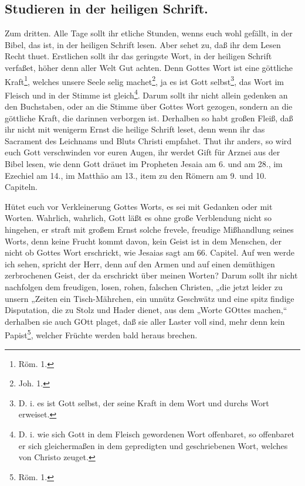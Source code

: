 \subsection*{Studieren in der heiligen Schrift.}

Zum dritten. Alle Tage sollt ihr etliche Stunden, wenns euch wohl gefällt, in der Bibel, das ist, in der heiligen Schrift
lesen. Aber sehet zu, daß ihr dem Lesen Recht thuet. Erstlichen sollt ihr das geringste Wort, in der heiligen Schrift verfaßet, höher denn aller Welt Gut achten. Denn Gottes Wort ist eine göttliche Kraft\footnote{Röm. 1.}, welches unsere Seele selig machet\footnote{Joh. 1.}, ja es ist Gott selbst\footnote{D. i. es ist Gott selbst, der seine Kraft in dem Wort und durchs Wort erweiset.}, das Wort im Fleisch und in der Stimme ist gleich\footnote{D. i. wie sich Gott in dem Fleisch gewordenen Wort offenbaret, so offenbaret er sich gleichermaßen in dem gepredigten und geschriebenen Wort, welches von Christo zeuget.}. Darum sollt ihr nicht allein gedenken an den Buchstaben, oder an die Stimme über Gottes Wort gezogen, sondern an die göttliche Kraft, die darinnen verborgen ist. Derhalben so habt großen Fleiß, daß ihr nicht mit wenigerm Ernst die heilige Schrift leset, denn wenn ihr das Sacrament des Leichnams und Bluts Christi empfahet. Thut ihr anders, so wird euch Gott verschwinden vor euren Augen, ihr werdet Gift für Arznei aus der Bibel lesen, wie denn Gott dräuet im Propheten Jesaia am 6. und am 28., im Ezechiel am 14., im Matthäo am 13., item zu den Römern am 9. und 10. Capiteln.

Hütet euch vor Verkleinerung Gottes Worts, es sei mit Gedanken oder mit Worten. Wahrlich, wahrlich, Gott läßt es ohne große Verblendung nicht so hingehen, er straft mit großem Ernst solche frevele, freudige Mißhandlung seines Worts, denn keine Frucht kommt davon, kein Geist ist in dem Menschen, der nicht ob Gottes Wort erschrickt, wie Jesaias sagt am 66. Capitel. Auf wen werde ich sehen, spricht der Herr, denn auf den Armen und auf einen demüthigen zerbrochenen Geist, der da erschrickt über meinen Worten? Darum sollt ihr nicht nachfolgen dem freudigen, losen, rohen, falschen Christen, „die jetzt leider zu unsern „Zeiten ein Tisch-Mährchen, ein unnütz Geschwätz und eine spitz%
findige Disputation, die zu Stolz und Hader dienet, aus dem „Worte GOttes machen,“ derhalben sie auch GOtt plaget, daß sie aller Laster voll sind, mehr denn kein Papist\footnote{Röm. 1.}, welcher Früchte werden bald heraus brechen.

